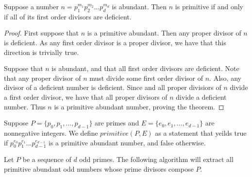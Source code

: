 \documentclass[../paper.tex]{subfiles}
\begin{document}
\begin{theorem}\label{del_minus_thm}
Suppose a number $n = p_1^{m_1} p_2^{m_2} ... p_d^{m_d}$ is 
abundant. Then $n$ is primitive if and only if all of its first
order divisors are deficient.
\end{theorem}

\begin{proof}
	First suppose that $n$ is a primitive abundant. Then any proper 
divisor of $n$ is deficient. As any first order divisor is a
proper divisor, we have that this direction is trivially true.

	Suppose that $n$ is abundant, and that all first order divisors
are deficient. Note that any proper divisor of $n$ must divide
some first order divisor of $n$. Also, any divisor of a deficient 
number is deficient. Since and all proper divisiors of $n$ divide 
a first order divisor, we have that all proper divisors of $n$ divide a
deficient number. Thus $n$ is a primitive abundant number, proving
the theorem.  
\end{proof}

Suppose $P = \{p_0, p_1, ...,p_{d-1}\}$ are primes and 
$E = \{e_0, e_1, ..., e_{d-1} \}$ are nonnegative integers.
We define $primitive(P,E)$ as a statement that yeilds true
if $p_0^{e_0} p_1^{e_1} ... p_{d-1}^{e_{d-1}}$ is a primitive
abundant number, and false otherwise.

\begin{theorem} 
Let $P$ be a sequence of $d$ odd primes. The 
following algorithm will extract all primitive
abundant odd numbers whose prime divisors compose $P$.
\end{theorem}
%
%
%
%
%
\end{document}
